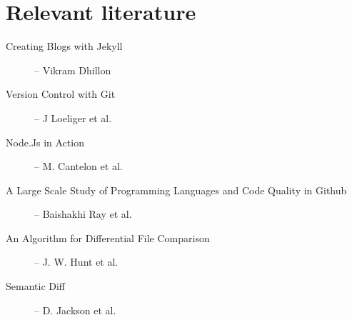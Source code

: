 \documentclass[a4paper,english,11pt]{article}
\begin{document}
\section{Relevant literature}
\begin{description}
\item [Creating Blogs with Jekyll] -- Vikram Dhillon\cite[]{dhillon2016}
\item [Version Control with Git] -- J Loeliger et al.\cite[]{loeliger2012version}
\item [Node.Js in Action] -- M. Cantelon et al.\cite[]{cantelon2017node}
\item [A Large Scale Study of Programming Languages and Code Quality in Github] -- Baishakhi Ray et al. \cite[]{ray2014github}
\item [An Algorithm for Differential File Comparison] -- J. W. Hunt et al.\cite[]{Hunt1975}
\item [Semantic Diff] -- D. Jackson et al.\cite[]{Jackson1994}
\end{description}

  
\MakeBibliography[nosplit]
\end{document}

